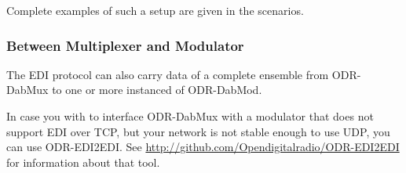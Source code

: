 Complete examples of such a setup are given in the scenarios.

\subsubsection{Between Multiplexer and Modulator}

The EDI protocol can also carry data of a complete ensemble from ODR-DabMux to
one or more instanced of ODR-DabMod.

In case you with to interface ODR-DabMux with a modulator that does not support
EDI over TCP, but your network is not stable enough to use UDP, you can use
ODR-EDI2EDI. See \url{http://github.com/Opendigitalradio/ODR-EDI2EDI} for
information about that tool.

